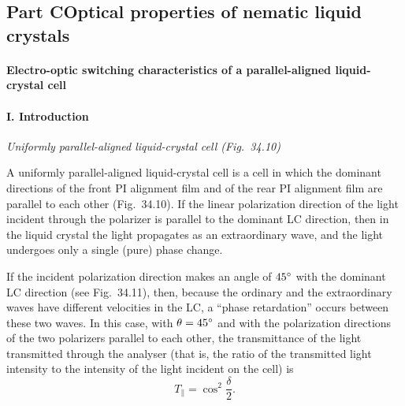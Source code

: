 \begin{center}
\end{center}

\subsection*{Part C\quad Optical properties of nematic liquid crystals}

\paragraph{Electro-optic switching characteristics of a parallel-aligned liquid-crystal cell}

\paragraph{I. Introduction}

\noindent\textit{Uniformly parallel-aligned liquid-crystal cell (Fig.~34.10)}

A uniformly parallel-aligned liquid-crystal cell is a cell in which the dominant directions of
the front PI alignment film and of the rear PI alignment film are parallel to each other
(Fig.~34.10). If the linear polarization direction of the light incident through the polarizer
is parallel to the dominant LC direction, then in the liquid crystal the light propagates as
an extraordinary wave, and the light undergoes only a single (pure) phase change.

If the incident polarization direction makes an angle of $45^{\circ}$ with the dominant LC
direction (see Fig.~34.11), then, because the ordinary and the extraordinary waves have
different velocities in the LC, a ``phase retardation'' occurs between these two waves. In
this case, with $\theta=45^{\circ}$ and with the polarization directions of the two polarizers
parallel to each other, the transmittance of the light transmitted through the analyser (that
is, the ratio of the transmitted light intensity to the intensity of the light incident on the
cell) is
\[
T_{\parallel}=\cos^{2}\frac{\delta}{2}.
\]

